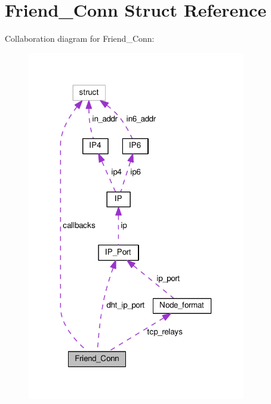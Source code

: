 \hypertarget{struct_friend___conn}{\section{Friend\+\_\+\+Conn Struct Reference}
\label{struct_friend___conn}
}


Collaboration diagram for Friend\+\_\+\+Conn\+:\nopagebreak
\begin{figure}[H]
\begin{center}
\leavevmode
\includegraphics[width=270pt]{struct_friend___conn__coll__graph}
\end{center}
\end{figure}
